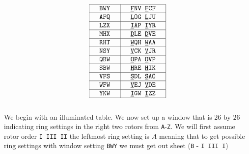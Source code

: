 \[
	\setlength{\arraycolsep}{15pt}
	\begin{array}{|c | c|}
		\hline
		\texttt{BWY} & \texttt{}{\uline{\texttt{F}}}\texttt{NV }{\uline{\texttt{F}}}\texttt{CF} \\
		\hline
		\texttt{AFQ} & \texttt{}{\uline{\texttt{L}}}\texttt{OG }{\uline{\texttt{L}}}\texttt{JU} \\
		\hline
		\texttt{LZX} & \texttt{}{\uline{\texttt{I}}}\texttt{AP }{\uline{\texttt{I}}}\texttt{YR} \\
		\hline
		\texttt{MHX} & \texttt{}{\uline{\texttt{D}}}\texttt{LE }{\uline{\texttt{D}}}\texttt{VE} \\
		\hline
		\texttt{RHT} & \texttt{}{\uline{\texttt{W}}}\texttt{QH }{\uline{\texttt{W}}}\texttt{AA} \\
		\hline
		\texttt{NSY} & \texttt{}{\uline{\texttt{V}}}\texttt{CK }{\uline{\texttt{V}}}\texttt{JR} \\
		\hline
		\texttt{QBW} & \texttt{}{\uline{\texttt{O}}}\texttt{PA }{\uline{\texttt{O}}}\texttt{VP} \\
		\hline
		\texttt{SBW} & \texttt{}{\uline{\texttt{H}}}\texttt{RE }{\uline{\texttt{H}}}\texttt{IK} \\
		\hline
		\texttt{VFS} & \texttt{}{\uline{\texttt{S}}}\texttt{DL }{\uline{\texttt{S}}}\texttt{AO} \\
		\hline
		\texttt{WFW} & \texttt{}{\uline{\texttt{V}}}\texttt{EJ }{\uline{\texttt{V}}}\texttt{DE} \\
		\hline
		\texttt{YKW} & \texttt{}{\uline{\texttt{I}}}\texttt{GW }{\uline{\texttt{I}}}\texttt{ZZ} \\
		\hline
	\end{array}
\]
\\We begin with an illuminated table. We now set up a window that is $26$ by $26$ indicating ring settings in the right two rotors from \texttt{A}-\texttt{Z}. We will first assume rotor order \texttt{I III II} the leftmost ring setting is $A$ meaning that to get possible ring settings with window setting \texttt{BWY} we must get out sheet (\texttt{B} - \texttt{I III I})
